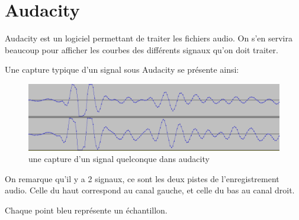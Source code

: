 \documentclass[12pt,a4paper]{report}
\begin{document}
	
\appendix
\chapter{Audacity}
Audacity est un logiciel permettant de traiter les fichiers audio.
On s'en servira beaucoup pour afficher les courbes des différents signaux qu'on doit traiter.

Une capture typique d'un signal sous Audacity se présente ainsi:

\begin{figure}[H]
\includegraphics[width=\textwidth]{img/dos_a_dos.png}
\caption{une capture d'un signal quelconque dans audacity}
\end{figure}

On remarque qu'il y a 2 signaux, ce sont les deux pistes de l'enregistrement audio. Celle du haut correspond au canal gauche, et celle du bas au canal droit.

Chaque point bleu représente un échantillon.
\end{document}

